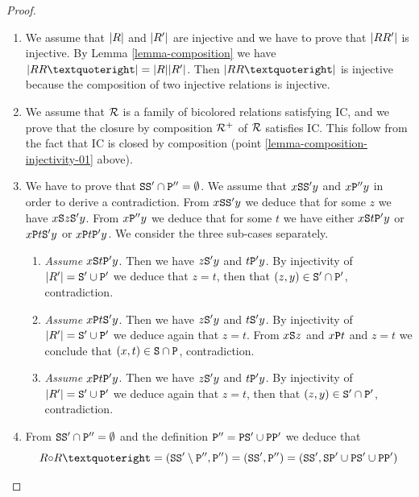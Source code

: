 \documentclass{lmcs}
\begin{document}
\begin{proof}
\begin{enumerate}

\item
We assume that ${| R |}$ and ${| R' |}$ are injective
and we have to prove that ${| RR' |}$ is injective.
By Lemma \ref{lemma-composition} we have $\universe{RR’} = \universe{R} \universe{R'}$. 
Then $\universe{RR’}$ is injective 
because the composition of two injective relations is injective.

\item
\label{lemma-composition-injectivity-02}
We assume that ${\mathcal R}$ is a family of bicolored relations satisfying IC, 
and we prove that the closure by composition ${\mathcal R}^+$ of ${\mathcal R}$
satisfies IC.
This follow from the fact that IC 
is closed by composition (point \ref{lemma-composition-injectivity-01} above).

\item
\label{lemma-composition-injectivity-03}
We have to prove that ${\tt S}{\tt S}' \cap {\tt P}'' = \emptyset$.
We assume that $x {\tt S}{\tt S}' y$ and $x {\tt P}'' y$ in order to derive a contradiction. 
From $x {\tt S}{\tt S}' y$ we deduce that for some $z$ we have 
$x {\tt S} z {\tt S}' y$. From $x {\tt P}'' y$ we deduce that for some $t$ we have 
either $x {\tt S} t {\tt P}' y$ or $x {\tt P} t {\tt S}' y$ or $x {\tt P} t {\tt P}' y$. 
We consider the three sub-cases separately.
\begin{enumerate}
\item
\emph{Assume $x {\tt S} t {\tt P}' y$}.
Then we have $z {\tt S}' y$ and $t {\tt P}' y$. By injectivity of 
${| R' |} = {\tt S}'\cup {\tt P}'$ we deduce that $z = t$, then that 
$(z,y) \in {\tt S}'\cap {\tt P}'$, contradiction. 
\item
\emph{Assume $x {\tt P} t {\tt S}' y$}. Then we have $z {\tt S}' y$ and $t {\tt S}' y$.
By injectivity of ${| R' |} = {\tt S}' \cup {\tt P}'$ we deduce again that $z = t$. 
From $x {\tt S} z$ and $x {\tt P} t$ and $z=t$ we conclude that 
$(x,t) \in {\tt S} \cap {\tt P}$, contradiction.
\item
\emph{Assume $x {\tt P} t {\tt P}' y$}. 
Then we have $z {\tt S}' y$ and $t {\tt P}' y$. By injectivity of 
${| R' |} = {\tt S}'\cup {\tt P}'$ we deduce again that $z = t$, then that 
$(z,y) \in {\tt S}'\cap {\tt P}'$, contradiction. 
\end{enumerate}

\item
\label{lemma-composition-injectivity-04}
From ${\tt S}{\tt S}'\cap {\tt P}'' = \emptyset$ and the definition
${\tt P}'' =  {\tt P}{\tt S}'\cup {\tt P}{\tt P}'$ we deduce that 
$$
R \comp R’
= 
(\Stat\Stat'\setminus \Prog'', \Prog'')
= 
(\Stat\Stat', \Prog'')
=
(\Stat\Stat',   \Stat\Prog' \cup \Prog\Stat'\cup \Prog\Prog' )
$$ 

\end{enumerate}
\end{proof}
\end{document}
